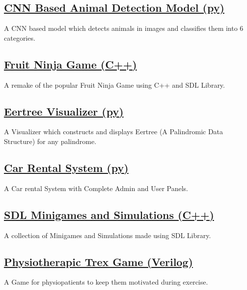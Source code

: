 \documentclass[]{m abbas resume' 2022}
\begin{document}
\begin{minipage}[t]{0.45\textwidth}
    \subsection{\href{https://github.com/smabbasht/CNN-Based-Animal-Detector}{\textbf{CNN Based Animal Detection Model (py)}}}%
    A CNN based model which detects animals in images and classifies them into 6 categories.

    \subsection{\href{https://github.com/smabbasht/Fruit-Ninja-Desktop-Game}{\textbf{Fruit Ninja Game (C++)}}}%
    A remake of the popular Fruit Ninja Game using C++ and SDL Library.

    \subsection{\href{https://github.com/smabbasht/Eertree-Visualizer}{\textbf{Eertree Visualizer (py)}}}%
    A Visualizer which constructs and displays Eertree (A Palindromic Data Structure) for any palindrome.

    \subsection{\href{https://github.com/smabbasht/Car-Rental-System}{\textbf{Car Rental System (py)}}}%
    A Car rental System with Complete Admin and User Panels.

    \subsection{\href{https://github.com/smabbasht/SDL-Minigames-and-Simulations}{\textbf{SDL Minigames and Simulations (C++)}}}%
    A collection of Minigames and Simulations made using SDL Library.

    \subsection{\href{https://github.com/smabbasht/Physiotherapic-Trex-Game}{\textbf{Physiotherapic Trex Game (Verilog)}}}%
    A Game for physiopatients to keep them motivated during exercise.
    


\end{minipage}
\end{document}

